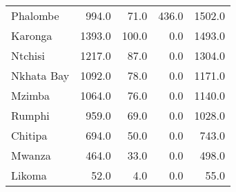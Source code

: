 \begin{tabular}{lrrrr}
Phalombe      &    994.0 &    71.0 &    436.0 &    1502.0 \\
Karonga       &   1393.0 &   100.0 &      0.0 &    1493.0 \\
Ntchisi       &   1217.0 &    87.0 &      0.0 &    1304.0 \\
Nkhata Bay    &   1092.0 &    78.0 &      0.0 &    1171.0 \\
Mzimba        &   1064.0 &    76.0 &      0.0 &    1140.0 \\
Rumphi        &    959.0 &    69.0 &      0.0 &    1028.0 \\
Chitipa       &    694.0 &    50.0 &      0.0 &     743.0 \\
Mwanza        &    464.0 &    33.0 &      0.0 &     498.0 \\
Likoma        &     52.0 &     4.0 &      0.0 &      55.0 \\
\bottomrule
\end{tabular}
